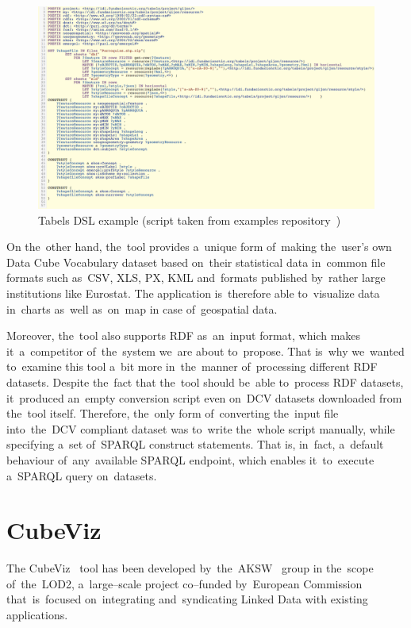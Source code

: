 \begin{figure}
	\centering
	\includegraphics[width=140mm]{img/tabels.png}
	\caption{Tabels DSL example (script taken from examples repository~\cite{tabels-web})}
	\label{fig:tabels}
\end{figure}

On the~other hand, the~tool provides a~unique form of~making the~user's own Data Cube 
Vocabulary dataset based on~their statistical data in~common file formats such as~CSV, XLS, PX, KML and~formats published by~rather large institutions like Eurostat. 
The application is~therefore able to~visualize data in~charts as~well as~on~map 
in case of~geospatial data.

Moreover, the~tool also supports RDF as~an~input format, which makes it~a~competitor of~the~system we~are about to~propose. That is~why we~wanted
to~examine this tool a~bit more in~the~manner of~processing different RDF 
datasets. Despite the~fact that the~tool should be~able to~process RDF 
datasets, it~produced an~empty conversion script even on~DCV datasets downloaded 
from the~tool itself. Therefore, the~only form of~converting the~input file into~the~DCV compliant dataset was to~write the~whole script manually, while 
specifying a~set of~SPARQL construct statements. That is, in~fact, a~default 
behaviour of~any~available SPARQL endpoint, which enables it~to~execute a~SPARQL 
query on~datasets.

\section{CubeViz}
\label{cubeviz}
The CubeViz~\cite{cubeviz} tool has been developed by~the~AKSW~\cite{aksw} group
in the~scope of~the~LOD2,
a~large--scale project co--funded by~European Commission that~is~focused on~integrating and~syndicating Linked Data with existing applications.

